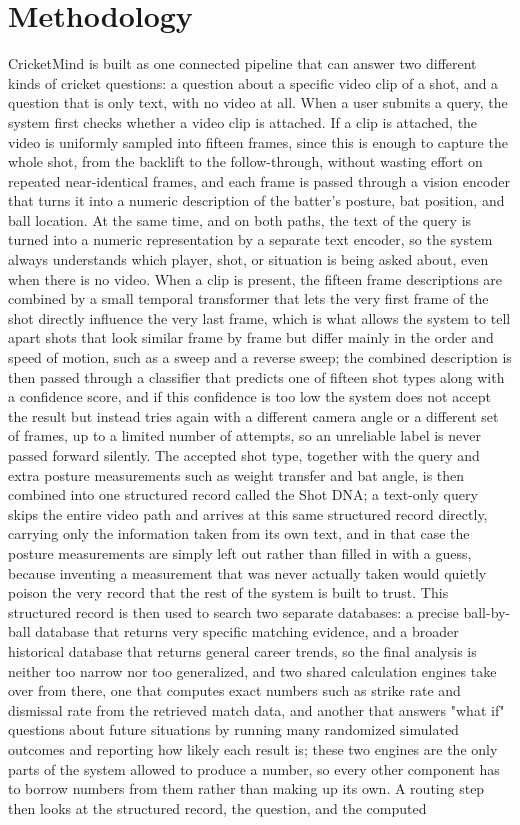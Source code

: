 \section{Methodology}

CricketMind is built as one connected pipeline that can answer two different kinds of cricket questions: a question about a specific video clip of a shot, and a question that is only text, with no video at all. When a user submits a query, the system first checks whether a video clip is attached. If a clip is attached, the video is uniformly sampled into fifteen frames, since this is enough to capture the whole shot, from the backlift to the follow-through, without wasting effort on repeated near-identical frames, and each frame is passed through a vision encoder that turns it into a numeric description of the batter's posture, bat position, and ball location. At the same time, and on both paths, the text of the query is turned into a numeric representation by a separate text encoder, so the system always understands which player, shot, or situation is being asked about, even when there is no video. When a clip is present, the fifteen frame descriptions are combined by a small temporal transformer that lets the very first frame of the shot directly influence the very last frame, which is what allows the system to tell apart shots that look similar frame by frame but differ mainly in the order and speed of motion, such as a sweep and a reverse sweep; the combined description is then passed through a classifier that predicts one of fifteen shot types along with a confidence score, and if this confidence is too low the system does not accept the result but instead tries again with a different camera angle or a different set of frames, up to a limited number of attempts, so an unreliable label is never passed forward silently. The accepted shot type, together with the query and extra posture measurements such as weight transfer and bat angle, is then combined into one structured record called the Shot DNA; a text-only query skips the entire video path and arrives at this same structured record directly, carrying only the information taken from its own text, and in that case the posture measurements are simply left out rather than filled in with a guess, because inventing a measurement that was never actually taken would quietly poison the very record that the rest of the system is built to trust. This structured record is then used to search two separate databases: a precise ball-by-ball database that returns very specific matching evidence, and a broader historical database that returns general career trends, so the final analysis is neither too narrow nor too generalized, and two shared calculation engines take over from there, one that computes exact numbers such as strike rate and dismissal rate from the retrieved match data, and another that answers "what if" questions about future situations by running many randomized simulated outcomes and reporting how likely each result is; these two engines are the only parts of the system allowed to produce a number, so every other component has to borrow numbers from them rather than making up its own. A routing step then looks at the structured record, the question, and the computed 